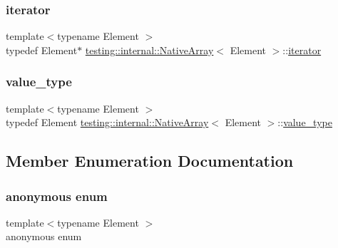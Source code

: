 \mbox{\label{classtesting_1_1internal_1_1NativeArray_ac1301a57977b57a1ad013e4e25fc2a72}} 
\subsubsection{\texorpdfstring{iterator}{iterator}}
{\footnotesize\ttfamily template$<$typename Element $>$ \\
typedef Element$\ast$ \hyperlink{classtesting_1_1internal_1_1NativeArray}{testing\+::internal\+::\+Native\+Array}$<$ Element $>$\+::\hyperlink{classtesting_1_1internal_1_1NativeArray_ac1301a57977b57a1ad013e4e25fc2a72}{iterator}}

\mbox{\label{classtesting_1_1internal_1_1NativeArray_a12216d686e16e4cc63d952fada5b2ba9}} 
\subsubsection{\texorpdfstring{value\+\_\+type}{value\_type}}
{\footnotesize\ttfamily template$<$typename Element $>$ \\
typedef Element \hyperlink{classtesting_1_1internal_1_1NativeArray}{testing\+::internal\+::\+Native\+Array}$<$ Element $>$\+::\hyperlink{classtesting_1_1internal_1_1NativeArray_a12216d686e16e4cc63d952fada5b2ba9}{value\+\_\+type}}



\subsection{Member Enumeration Documentation}
\mbox{\label{classtesting_1_1internal_1_1NativeArray_abe36a7e1b487dc6b9bd81489b1c2af28}} 
\subsubsection{\texorpdfstring{anonymous enum}{anonymous enum}}
{\footnotesize\ttfamily template$<$typename Element $>$ \\
anonymous enum\hspace{0.3cm}{\ttfamily [private]}}

